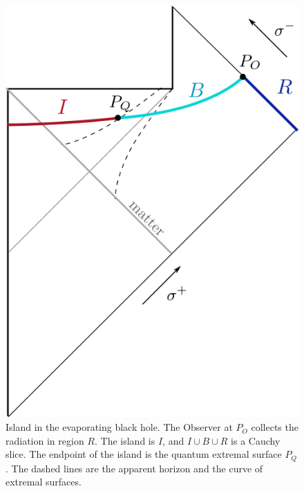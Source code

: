 \documentclass[12pt,oneside,letterpaper]{article}
\numberwithin{equation}{section}
\begin{document}
\begin{figure}
\begin{center}
\includegraphics[scale=0.8]{figures/evap-big.png}
\end{center}
\caption{\small Island in the evaporating black hole. The Observer at $P_O$ collects the radiation in region $R$. The island is $I$, and $I \cup B \cup R$ is a Cauchy slice. The endpoint of the island is the quantum extremal surface $P_Q$. The dashed lines are the apparent horizon and the curve of extremal surfaces. \label{fig:evap-big}}
\end{figure}
\end{document}
